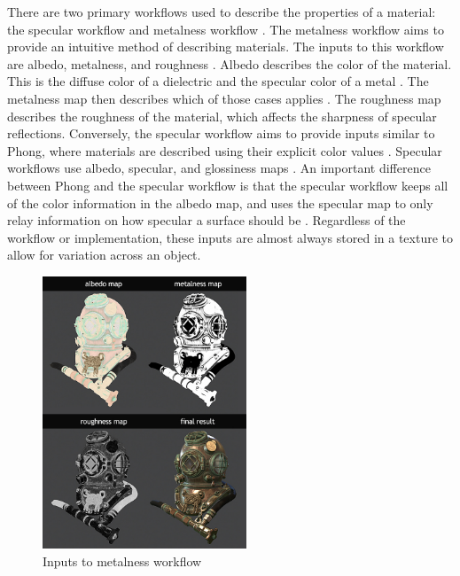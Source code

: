 \documentclass[12pt, letterpaper, twocolumn]{article}
\begin{document}
There are two primary workflows used to describe the properties of a material:
the specular workflow and metalness workflow \cite{MTex}. The metalness
workflow aims to provide an intuitive method of describing materials. The
inputs to this workflow are albedo, metalness, and roughness \cite{MTex}.
Albedo describes the color of the material. This is the diffuse color of a
dielectric and the specular color of a metal \cite{MTex}. The metalness map
then describes which of those cases applies \cite{MTex}. The roughness map
describes the roughness of the material, which affects the sharpness of
specular reflections\cite{MTex}. Conversely, the specular workflow aims to
provide inputs similar to Phong, where materials are described using their
explicit color values \cite{MTex}. Specular workflows use albedo, specular,
and glossiness maps \cite{MTex}. An important difference between Phong and the
specular workflow is that the specular workflow keeps all of the color
information in the albedo map, and uses the specular map to only relay
information on how specular a surface should be \cite{MTex}. Regardless of the
workflow or implementation, these inputs are almost always stored in a texture
to allow for variation across an object.

\begin{figure}
\centering \includegraphics[height=3.2in]{metalness_workflow.jpg}
\caption{Inputs to metalness workflow}
\end{figure}
\end{document}
